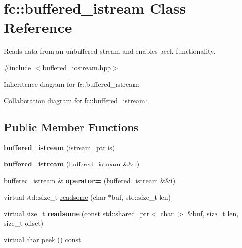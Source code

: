 \hypertarget{classfc_1_1buffered__istream}{}\section{fc\+:\+:buffered\+\_\+istream Class Reference}
\label{classfc_1_1buffered__istream}


Reads data from an unbuffered stream and enables peek functionality.  




{\ttfamily \#include $<$buffered\+\_\+iostream.\+hpp$>$}



Inheritance diagram for fc\+:\+:buffered\+\_\+istream\+:


Collaboration diagram for fc\+:\+:buffered\+\_\+istream\+:
\subsection*{Public Member Functions}
\begin{DoxyCompactItemize}
\item 
\mbox{\label{classfc_1_1buffered__istream_a2685f9f7e8514c848839b859d173dec6}} 
{\bfseries buffered\+\_\+istream} (istream\+\_\+ptr is)
\item 
\mbox{\label{classfc_1_1buffered__istream_a6af022ec9841657f60d00089ddd2de90}} 
{\bfseries buffered\+\_\+istream} (\mbox{\hyperlink{classfc_1_1buffered__istream}{buffered\+\_\+istream}} \&\&o)
\item 
\mbox{\label{classfc_1_1buffered__istream_aa312532164c62e95fc7ecb2927d15465}} 
\mbox{\hyperlink{classfc_1_1buffered__istream}{buffered\+\_\+istream}} \& {\bfseries operator=} (\mbox{\hyperlink{classfc_1_1buffered__istream}{buffered\+\_\+istream}} \&\&i)
\item 
virtual std\+::size\+\_\+t \mbox{\hyperlink{classfc_1_1buffered__istream_aeadf77cad3bfaa31b52fe719f6b01fce}{readsome}} (char $\ast$buf, std\+::size\+\_\+t len)
\item 
\mbox{\label{classfc_1_1buffered__istream_a462190e5205b4aaad1ad0108f31dd7d4}} 
virtual size\+\_\+t {\bfseries readsome} (const std\+::shared\+\_\+ptr$<$ char $>$ \&buf, size\+\_\+t len, size\+\_\+t offset)
\item 
virtual char \mbox{\hyperlink{classfc_1_1buffered__istream_a35c2540f97e42e3281457af50a7717b9}{peek}} () const
\end{DoxyCompactItemize}


